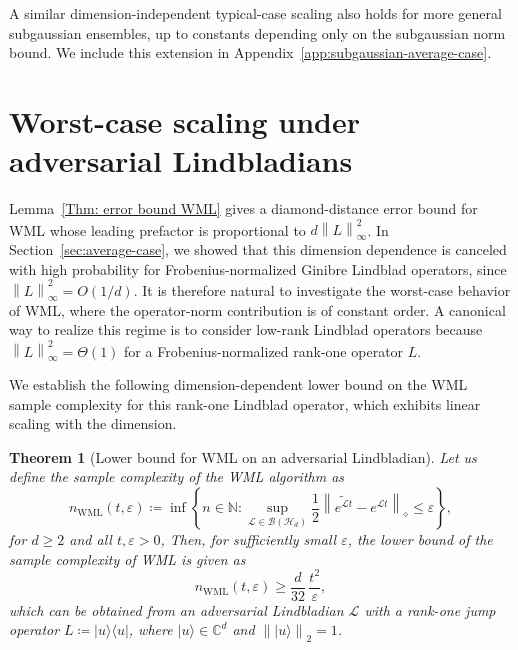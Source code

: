 \documentclass[superscriptaddress,amsmath,amssymb,aps,pra,letterpaper,tightenlines,notitlepages,12pt]{revtex4-2}
\newtheorem{theorem}{Theorem}
\begin{document}
\medskip

A similar dimension-independent typical-case scaling also holds for more general subgaussian ensembles, up to constants depending only on the subgaussian norm bound. 
We include this extension in Appendix~\ref{app:subgaussian-average-case}.

\section{Worst-case scaling under adversarial Lindbladians}
\label{sec:worst-case}
Lemma~\ref{Thm: error bound WML} gives a diamond-distance error bound for WML whose leading prefactor is proportional to $d\left\|L\right\|_\infty^2$. In Section~\ref{sec:average-case}, we showed that this dimension dependence is canceled with high probability for Frobenius-normalized Ginibre Lindblad operators, since $\left\|L\right\|_\infty^2=O(1/d)$. It is therefore natural to investigate the worst-case behavior of WML, where the operator-norm contribution is of constant order. A canonical way to realize this regime is to consider low-rank Lindblad operators because $\left\|L\right\|_\infty^2=\Theta(1)$ for a Frobenius-normalized rank-one operator $L$. 

We establish the following dimension-dependent lower bound on the WML sample complexity for this rank-one Lindblad operator, which exhibits linear scaling with the dimension.
\begin{theorem}[Lower bound for WML on an adversarial Lindbladian]
\label{prop:rankone_lower}
Let us define the sample complexity of the WML algorithm as
\begin{equation}
    n_{\mathrm{WML}}(t,\varepsilon) \coloneqq 
    \inf\left\{n\in\mathbb N: \sup_{\mathcal{L}\in\mathcal{B}(\mathcal{H}_d)}\frac{1}{2}\left\|
    \widetilde{e^{\mathcal{L} t}} - e^{\mathcal{L} t}\right\|_\diamond
    \le \varepsilon
    \right\},
\end{equation}
for $d\geq 2$ and all $t,\varepsilon>0$, 
Then, for sufficiently small $\varepsilon$, the lower bound of the sample complexity of WML is given as
\begin{equation}
n_{\mathrm{WML}}(t,\varepsilon)
\ge
\frac{d}{32}\,
\frac{t^2}{\varepsilon},
\label{eq:rankone_lower_rzero}
\end{equation}
which can be obtained from an adversarial Lindbladian $\mathcal{L}$ with a rank-one jump operator $L\coloneqq |u\rangle\langle u|$, where $|u\rangle\in\mathbb C^d$ and $\left\| |u\rangle \right\|_2=1$.
\end{theorem}
\end{document}
